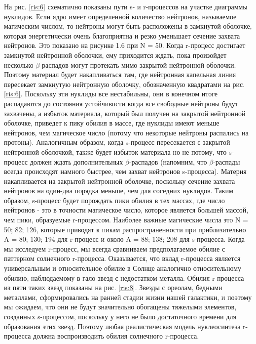 \documentclass[%
master,    %
natbib,      %
subf,        %
href,        %
colorlinks,  %
]{disser}
\begin{document}
На рис. \ref{ris:6} схематично показаны пути s- и r-процессов на участке диаграммы нуклидов. Если ядро имеет определенной количество нейтронов, называемое магическим числом, то нейтроны могут быть расположены в замкнутой оболочке, которая энергетически очень благоприятна и резко уменьшает сечение захвата нейтронов. Это показано на рисунке 1.6 при N = 50. Когда r-процесс достигает замкнутой нейтронной оболочки, ему приходится ждать, пока произойдет несколько $\beta$-распадов могут протекать мимо закрытой нейтронной оболочки. Поэтому материал будет накапливаться там, где нейтронная капельная линия пересекает замкнутую нейтронную оболочку, обозначенную квадратами на рис. \ref{ris:6}. Поскольку эти нуклиды все нестабильны, они в конечном итоге распадаются до состояния устойчивости когда все свободные нейтроны будут захвачены, а избыток материала, который был получен на закрытой нейтронной оболочке, приведет к пику обилия в массе, где нуклиды имеют меньше нейтронов, чем магическое число (потому что некоторые нейтроны распались на протоны). Аналогичным образом, когда s-процесс пересекается с закрытой нейтронной оболочкой, также будет избыток материала но не потому, что s-процесс должен ждать дополнительных $\beta$-распадов (напомним, что $\beta$-распады всегда происходят намного быстрее, чем захват нейтронов s-процесса). Материя накапливается на закрытой нейтронной оболочке, поскольку сечение захвата нейтронов на один-два порядка меньше, чем для соседних нуклидов. Таким образом, s-процесс будет порождать пики обилия в тех массах, где число нейтронов - это в точности магическое число, которое является большей массой, чем пики, образуемые r-процессом. Наиболее важные магические числа это N = 50; 82; 126, которые приводят к пикам распространенности при приблизительно A = 80; 130; 194 для r-процесс и около A = 88; 138; 208 для s-процесса. Когда мы исследуем r-процесс, мы всегда сравниваем предполагаемое обилие с паттерном солнечного r-процесса. Оказывается, что вклад r-процесса является универсальным и относительное обилие в Солнце аналогично относительному обилию, наблюдаемому в гало звезд с недостатком металла. Обилия r-процесса из пяти таких звезд показаны на рис. \ref{ris:8}. Звезды с ореолам, бедными металлами, сформировались на ранней стадии жизни нашей галактики, и поэтому мы ожидаем, что они не будут значительно обогащены тяжелыми элементов, созданных s-процессом, поскольку у него не было достаточного времени для образования этих звезд. Поэтому любая реалистическая модель нуклеосинтеза r-процесса должна воспроизводить обилия солнечного r-процесса.
\end{document}
